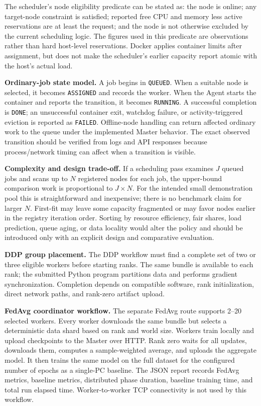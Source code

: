 \documentclass{article}
\begin{document}
The scheduler's node eligibility predicate can be stated as: the node is online; any target-node constraint is satisfied; reported free CPU and memory less active reservations are at least the request; and the node is not otherwise excluded by the current scheduling logic. The figures used in this predicate are observations rather than hard host-level reservations. Docker applies container limits after assignment, but does not make the scheduler's earlier capacity report atomic with the host's actual load.

\textbf{Ordinary-job state model.} A job begins in \texttt{QUEUED}. When a suitable node is selected, it becomes \texttt{ASSIGNED} and records the worker. When the Agent starts the container and reports the transition, it becomes \texttt{RUNNING}. A successful completion is \texttt{DONE}; an unsuccessful container exit, watchdog failure, or activity-triggered eviction is reported as \texttt{FAILED}. Offline-node handling can return affected ordinary work to the queue under the implemented Master behavior. The exact observed transition should be verified from logs and API responses because process/network timing can affect when a transition is visible.

\textbf{Complexity and design trade-off.} If a scheduling pass examines \(J\) queued jobs and scans up to \(N\) registered nodes for each job, the upper-bound comparison work is proportional to \(J\times N\). For the intended small demonstration pool this is straightforward and inexpensive; there is no benchmark claim for larger \(N\). First-fit may leave some capacity fragmented or may favor nodes earlier in the registry iteration order. Sorting by resource efficiency, fair shares, load prediction, queue aging, or data locality would alter the policy and should be introduced only with an explicit design and comparative evaluation.

\textbf{DDP group placement.} The DDP workflow must find a complete set of two or three eligible workers before starting ranks. The same bundle is available to each rank; the submitted Python program partitions data and performs gradient synchronization. Completion depends on compatible software, rank initialization, direct network paths, and rank-zero artifact upload.

\textbf{FedAvg coordinator workflow.} The separate FedAvg route supports 2--20 selected workers. Every worker downloads the same bundle but selects a deterministic data shard based on rank and world size. Workers train locally and upload checkpoints to the Master over HTTP. Rank zero waits for all updates, downloads them, computes a sample-weighted average, and uploads the aggregate model. It then trains the same model on the full dataset for the configured number of epochs as a single-PC baseline. The JSON report records FedAvg metrics, baseline metrics, distributed phase duration, baseline training time, and total run elapsed time. Worker-to-worker TCP connectivity is not used by this workflow.
\end{document}
